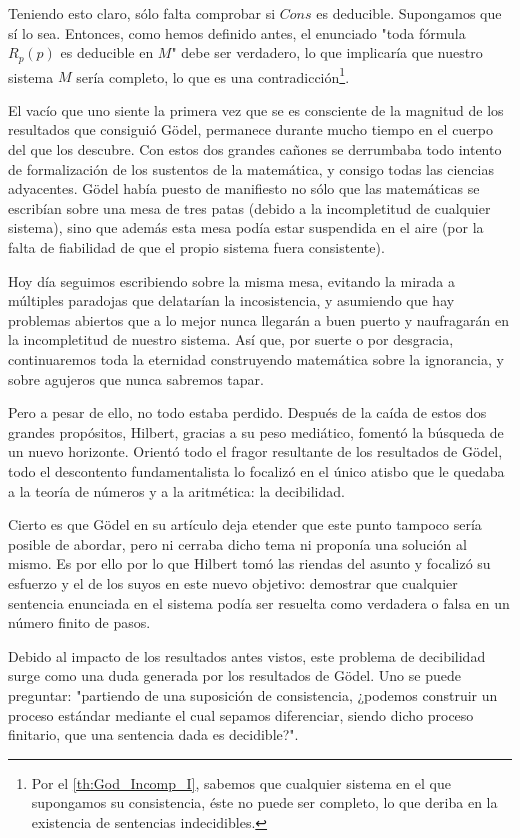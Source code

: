 Teniendo esto claro, sólo falta comprobar si $Cons$ es deducible. Supongamos que sí lo sea. Entonces, como hemos definido antes, el enunciado "toda fórmula $R_p(p)$ es deducible en $M$" debe ser verdadero, lo que implicaría que nuestro sistema $M$ sería completo, lo
que es una contradicción\footnote{Por el \eqref{th:God_Incomp_I}, sabemos que cualquier sistema en el que supongamos su consistencia, éste no puede ser completo, lo que deriba en la existencia de sentencias indecidibles.}.

El vacío que uno siente la primera vez que se es consciente de la magnitud de los resultados que consiguió Gödel, permanece durante mucho tiempo en el cuerpo del que los descubre. Con estos dos grandes cañones se derrumbaba todo intento de formalización de los sustentos 
de la matemática, y consigo todas las ciencias adyacentes. Gödel había puesto de manifiesto no sólo que las matemáticas se escribían sobre una mesa de tres patas (debido a la incompletitud de cualquier sistema), sino que además esta mesa podía estar suspendida en el aire
(por la falta de fiabilidad de que el propio sistema fuera consistente). 

Hoy día seguimos escribiendo sobre la misma mesa, evitando la mirada a múltiples paradojas que delatarían la incosistencia, y asumiendo que hay problemas abiertos que a lo mejor nunca llegarán a buen puerto y naufragarán en la incompletitud de nuestro sistema.
Así que, por suerte o por desgracia, continuaremos toda la eternidad construyendo matemática sobre la ignorancia, y sobre agujeros que nunca sabremos tapar.

Pero a pesar de ello, no todo estaba perdido. Después de la caída de estos dos grandes propósitos, Hilbert, gracias a su peso mediático, fomentó la búsqueda de un nuevo horizonte. Orientó todo el fragor resultante de los resultados de Gödel, todo el descontento
fundamentalista lo focalizó en el único atisbo que le quedaba a la teoría de números y a la aritmética: la decibilidad. 

Cierto es que Gödel en su artículo deja etender que este punto tampoco sería posible de abordar, pero ni cerraba dicho tema ni proponía una solución al mismo. Es por ello por lo que Hilbert tomó las riendas del asunto y focalizó su esfuerzo y el de los suyos 
en este nuevo objetivo: demostrar que cualquier sentencia enunciada en el sistema podía ser resuelta como verdadera o falsa en un número finito de pasos. 

Debido al impacto de los resultados antes vistos, este problema de decibilidad surge como una duda generada por los resultados de Gödel. Uno se puede preguntar: "partiendo de una suposición de consistencia, ¿podemos construir un proceso estándar mediante el cual 
sepamos diferenciar, siendo dicho proceso finitario, que una sentencia dada es decidible?".

